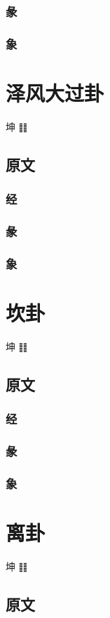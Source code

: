 \documentclass[12pt,oneside]{book}
\begin{document}
\subsection{彖}
\subsection{象}


\chapter{泽风大过卦}
坤 ䷁

\section{原文}
\subsection{经}
\subsection{彖}
\subsection{象}


\chapter{坎卦}
坤 ䷁

\section{原文}
\subsection{经}
\subsection{彖}
\subsection{象}

\chapter{离卦}
坤 ䷁

\section{原文}
\end{document}
